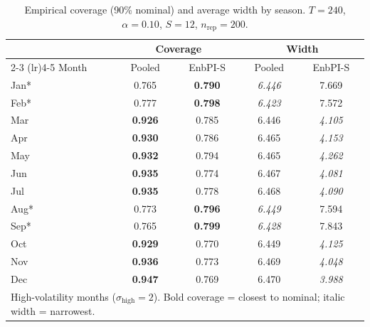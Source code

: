 \begin{table}[ht]
\centering
\caption{Empirical coverage (90\% nominal) and average width by season.
$T=240$, $\alpha=0.10$, $S=12$, $n_{\mathrm{rep}}=200$.}
\label{tab:e1_coverage_T240}
\begin{tabular}{l cc cc}
\toprule
 & \multicolumn{2}{c}{Coverage} & \multicolumn{2}{c}{Width} \\
\cmidrule(lr){2-3} \cmidrule(lr){4-5}
Month & Pooled & EnbPI-S & Pooled & EnbPI-S \\
\midrule
Jan* & 0.765 & \textbf{0.790} & \textit{6.446} & 7.669 \\
Feb* & 0.777 & \textbf{0.798} & \textit{6.423} & 7.572 \\
Mar & \textbf{0.926} & 0.785 & 6.446 & \textit{4.105} \\
Apr & \textbf{0.930} & 0.786 & 6.465 & \textit{4.153} \\
May & \textbf{0.932} & 0.794 & 6.465 & \textit{4.262} \\
Jun & \textbf{0.935} & 0.774 & 6.467 & \textit{4.081} \\
Jul & \textbf{0.935} & 0.778 & 6.468 & \textit{4.090} \\
Aug* & 0.773 & \textbf{0.796} & \textit{6.449} & 7.594 \\
Sep* & 0.765 & \textbf{0.799} & \textit{6.428} & 7.843 \\
Oct & \textbf{0.929} & 0.770 & 6.449 & \textit{4.125} \\
Nov & \textbf{0.936} & 0.773 & 6.469 & \textit{4.048} \\
Dec & \textbf{0.947} & 0.769 & 6.470 & \textit{3.988} \\
\bottomrule
\multicolumn{5}{l}{\footnotesize * High-volatility months ($\sigma_{\mathrm{high}}=2$).  Bold coverage = closest to nominal; italic width = narrowest.}\\
\end{tabular}
\end{table}
